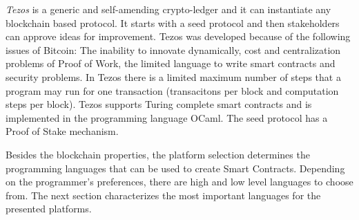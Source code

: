\documentclass[conference]{IEEEtran}
\begin{document}
\textit{Tezos} is a generic and self-amending crypto-ledger and it can instantiate any blockchain based protocol. It starts with a seed protocol and then stakeholders can approve ideas for improvement. Tezos was developed because of the following issues of Bitcoin: The inability to innovate dynamically, cost and centralization problems of Proof of Work, the limited language to write smart contracts and security problems. In Tezos there is a limited maximum number of steps that a program may run for one transaction (transacitons per block and computation steps per block). Tezos supports Turing complete smart contracts and is implemented in the programming language OCaml. The seed protocol has a Proof of Stake mechanism.  \cite{Goodman2014}\cite{Goodman2014a} \par 
Besides the blockchain properties, the platform selection determines the programming languages that can be used to create Smart Contracts. Depending on the programmer's preferences, there are high and low level languages to choose from. The next section characterizes the most important languages for the presented platforms.
\end{document}
